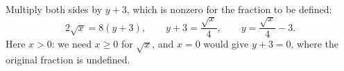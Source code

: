 Multiply both sides by $y+3$, which is nonzero for the fraction to be defined:
\[
2\sqrt x=8(y+3),\qquad y+3=\dfrac{\sqrt x}{4},\qquad \boxed{y=\dfrac{\sqrt x}{4}-3}.
\]
Here $x>0$: we need $x\ge0$ for $\sqrt x$, and $x=0$ would give $y+3=0$, where the original fraction is undefined.
